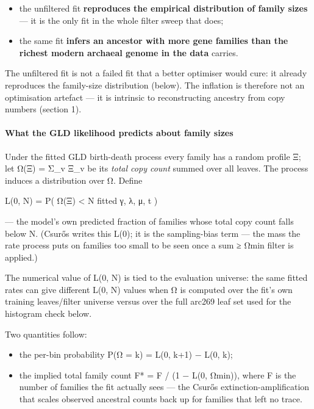 \documentclass[
  10pt,
]{article}
\providecommand{\tightlist}{%
  \setlength{\itemsep}{0pt}\setlength{\parskip}{0pt}}
\begin{document}
\begin{itemize}
\tightlist
\item
  the unfiltered fit \textbf{reproduces the empirical distribution of
  family sizes} --- it is the only fit in the whole filter sweep that
  does;
\item
  the same fit \textbf{infers an ancestor with more gene families than
  the richest modern archaeal genome in the data} carries.
\end{itemize}

The unfiltered fit is not a failed fit that a better optimiser would
cure: it already reproduces the family-size distribution (below). The
inflation is therefore not an optimisation artefact --- it is intrinsic
to reconstructing ancestry from copy numbers (section 1).

\paragraph{What the GLD likelihood predicts about family
sizes}\label{what-the-gld-likelihood-predicts-about-family-sizes}

Under the fitted GLD birth-death process every family has a random
profile Ξ; let Ω(Ξ) = Σ\_v Ξ\_v be its \emph{total copy count} summed
over all leaves. The process induces a distribution over Ω. Define

L(0, N) = P( Ω(Ξ) \textless{} N \textbar{} fitted γ, λ, μ, t )

--- the model's own predicted fraction of families whose total copy
count falls below N. (Csurős writes this L(0); it is the sampling-bias
term --- the mass the rate process puts on families too small to be seen
once a sum ≥ Ωmin filter is applied.)

The numerical value of L(0, N) is tied to the evaluation universe: the
same fitted rates can give different L(0, N) values when Ω is computed
over the fit's own training leaves/filter universe versus over the full
arc269 leaf set used for the histogram check below.

Two quantities follow:

\begin{itemize}
\tightlist
\item
  the per-bin probability P(Ω = k) = L(0, k+1) − L(0, k);
\item
  the implied total family count F* = F / (1 − L(0, Ωmin)), where F is
  the number of families the fit actually sees --- the Csurős
  extinction-amplification that scales observed ancestral counts back up
  for families that left no trace.
\end{itemize}
\end{document}
